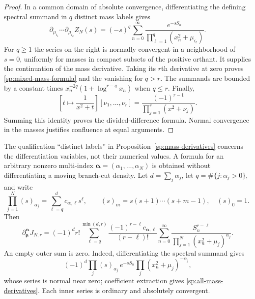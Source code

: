 \begin{proof}
In a common domain of absolute convergence, differentiating the
defining spectral summand in $q$ distinct mass labels gives
\[
 \partial_{\mu_{i_1}}\cdots\partial_{\mu_{i_q}}Z_N(s)
 =(-s)^q\sum_{n=0}^{\infty}
     \frac{e^{-sS_n}}{\prod_{\ell=1}^{q}(x_n^2+\mu_{i_\ell})}.
\]
For $q\geq1$ the series on the right is normally convergent in
a neighborhood of $s=0$, uniformly for masses in compact subsets
of the positive orthant.  It supplies the continuation of the
mass derivative.  Taking its $r$th derivative at zero proves
\eqref{sp:mixed-mass-formula} and the vanishing for $q>r$.
The summands are bounded by a constant times
$x_n^{-2q}(1+\log^{r-q}x_n)$ when $q\leq r$.
Finally,
\[
 \left[t\longmapsto\frac{1}{x^2+t}\right]
        [\nu_1,\ldots,\nu_r]
 =\frac{(-1)^{r-1}}{\prod_{j=1}^{r}(x^2+\nu_j)}.
\]
Summing this identity proves the divided-difference formula.
Normal convergence in the masses justifies confluence at equal
arguments.
\end{proof}

\begin{remark}
\label{sp:repeated-mass-derivatives}
The qualification ``distinct labels'' in
Proposition~\ref{sp:mass-derivatives} concerns the differentiation
variables, not their numerical values.  A formula for an arbitrary
nonzero multi-index $\boldsymbol\alpha=(\alpha_1,\ldots,\alpha_N)$
is obtained without differentiating a moving branch-cut density.
Let $d=\sum_j\alpha_j$, let $q=\#\{j:\alpha_j>0\}$, and write
\[
 \prod_{j=1}^{N}(s)_{\alpha_j}
      =\sum_{\ell=q}^{d}c_{\boldsymbol\alpha,\ell}s^\ell,
 \qquad (s)_m=s(s+1)\cdots(s+m-1),\quad (s)_0=1.
\]
Then
\begin{equation}
 \partial_{\boldsymbol\mu}^{\boldsymbol\alpha}J_{N,r}
 =(-1)^d r!\sum_{\ell=q}^{\min(d,r)}
       \frac{(-1)^{r-\ell}c_{\boldsymbol\alpha,\ell}}{(r-\ell)!}
       \sum_{n=0}^{\infty}
       \frac{S_n^{r-\ell}}
            {\prod_{j=1}^{N}(x_n^2+\mu_j)^{\alpha_j}}.
 \label{sp:all-mass-derivatives}
\end{equation}
An empty outer sum is zero.  Indeed, differentiating the spectral
summand gives
\[
 (-1)^d\prod_j(s)_{\alpha_j}\,e^{-sS_n}
                  \prod_j(x_n^2+\mu_j)^{-\alpha_j},
\]
whose series is normal near
zero; coefficient extraction gives
\eqref{sp:all-mass-derivatives}.  Each inner series is ordinary
and absolutely convergent.
\end{remark}

